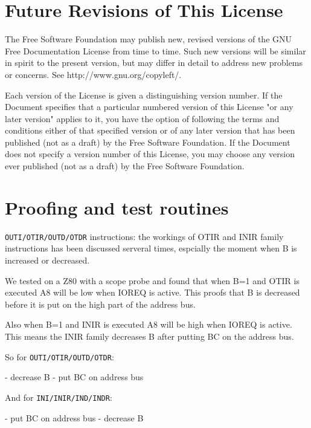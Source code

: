 \documentclass[oneside,a4paper]{book}
\begin{document}
\section{Future Revisions of This License}

The Free Software Foundation may publish new, revised versions
of the GNU Free Documentation License from time to time.  Such new
versions will be similar in spirit to the present version, but may
differ in detail to address new problems or concerns. See
http://www.gnu.org/copyleft/.

Each version of the License is given a distinguishing version number.
If the Document specifies that a particular numbered version of this
License "or any later version" applies to it, you have the option of
following the terms and conditions either of that specified version or
of any later version that has been published (not as a draft) by the
Free Software Foundation.  If the Document does not specify a version
number of this License, you may choose any version ever published (not
as a draft) by the Free Software Foundation.



\section{Proofing and test routines} 

{\tt OUTI/OTIR/OUTD/OTDR} instructions: the workings of OTIR and INIR family instructions has been discussed serveral times, espcially
the moment when B is increased or decreased.

We tested on a Z80 with a scope probe and found that when B=1 and OTIR is executed A8 will be low when IOREQ is active.
This proofs that B is decreased before it is put on the high part of the address bus.

Also when B=1 and INIR is executed A8 will be high when IOREQ is active. This means the INIR family decreases B after 
putting BC on the address bus.

So for {\tt OUTI/OTIR/OUTD/OTDR}:

- decrease B
- put BC on address bus

And for {\tt INI/INIR/IND/INDR}:

- put BC on address bus
- decrease B
\end{document}

